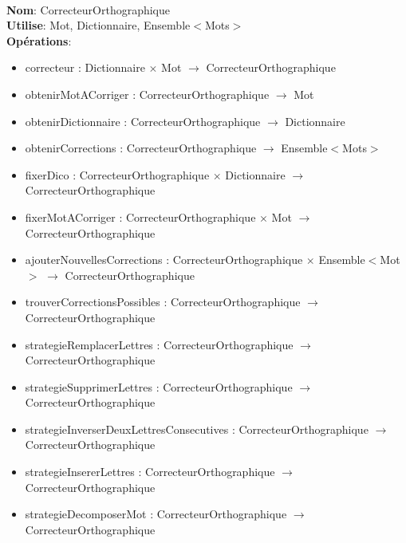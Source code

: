 \documentclass{article}
\begin{document}
    \noindent
    \\
    \textbf{Nom}: CorrecteurOrthographique \\
    \textbf{Utilise}: Mot, Dictionnaire, Ensemble$<$Mots$>$ \\
    \textbf{Opérations}: \begin{itemize}[label=$\ $, leftmargin=2cm, itemsep=0cm]
        \item correcteur : Dictionnaire $\times$ Mot $\rightarrow$ CorrecteurOrthographique
        \item obtenirMotACorriger : CorrecteurOrthographique $\rightarrow$ Mot
        \item obtenirDictionnaire : CorrecteurOrthographique $\rightarrow$ Dictionnaire
        \item obtenirCorrections : CorrecteurOrthographique $\rightarrow$ Ensemble$<$Mots$>$
        \item fixerDico : CorrecteurOrthographique $\times$ Dictionnaire $\rightarrow$ CorrecteurOrthographique
        \item fixerMotACorriger : CorrecteurOrthographique $\times$ Mot $\rightarrow$ CorrecteurOrthographique
        \item ajouterNouvellesCorrections : CorrecteurOrthographique $\times$ Ensemble$<$Mot$>$ $\rightarrow$ CorrecteurOrthographique
        \item trouverCorrectionsPossibles : CorrecteurOrthographique $\rightarrow$ CorrecteurOrthographique
        \item strategieRemplacerLettres : CorrecteurOrthographique $\rightarrow$ CorrecteurOrthographique
        \item strategieSupprimerLettres : CorrecteurOrthographique $\rightarrow$ CorrecteurOrthographique
        \item strategieInverserDeuxLettresConsecutives : CorrecteurOrthographique $\rightarrow$ CorrecteurOrthographique
        \item strategieInsererLettres : CorrecteurOrthographique $\rightarrow$ CorrecteurOrthographique
        \item strategieDecomposerMot : CorrecteurOrthographique $\rightarrow$ CorrecteurOrthographique
    \end{itemize}
\end{document}
